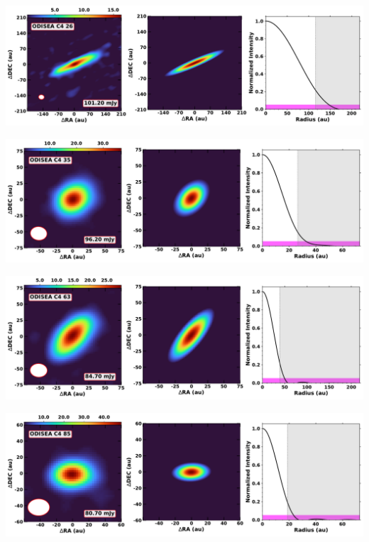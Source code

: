 \vspace{0pt}
\begin{minipage}{.49\textwidth}
	 \centering
	 	 \hrulesep
	 	 \includegraphics[width=1\linewidth]{pdf/0+I_F/065_odisea_c4_26_cutout.pdf}
\end{minipage}%
\vrulesep
\begin{minipage}{.49\textwidth}
	 \centering
	 	 \hrulesep
	 	 \includegraphics[width=1\linewidth]{pdf/0+I_F/063_odisea_c4_35_cutout.pdf}
\end{minipage}%
\vspace{0pt}
\begin{minipage}{.49\textwidth}
	 \centering
	 	 \hrulesep
	 	 \includegraphics[width=1\linewidth]{pdf/0+I_F/060_odisea_c4_63_cutout.pdf}
\end{minipage}%
\vrulesep
\begin{minipage}{.49\textwidth}
	 \centering
	 	 \hrulesep
	 	 \includegraphics[width=1\linewidth]{pdf/0+I_F/058_odisea_c4_85_cutout.pdf}
\end{minipage}%
